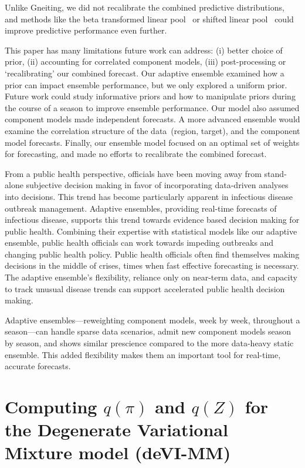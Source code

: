 \documentclass[12pt]{article}
\begin{document}
Unlike Gneiting, we did not recalibrate the combined predictive distributions, and methods like the beta transformed linear pool~\cite{ranjan2010combining} or shifted linear pool~\cite{kleiber2011locally} could improve predictive performance even further.

This paper has many limitations future work can address: (i) better choice of prior, (ii) accounting for correlated component models, (iii) post-processing or `recalibrating' our combined forecast.
Our adaptive ensemble examined how a prior can impact ensemble performance, but we only explored a uniform prior.
Future work could study informative priors and how to manipulate priors during the course of a season to improve ensemble performance.
Our model also assumed component models made independent forecasts.
A more advanced ensemble would examine the correlation structure of the data~(region, target), and the component model forecasts.
Finally, our ensemble model focused on an optimal set of weights for forecasting, and made no efforts to recalibrate the combined forecast.\cite{gneiting2013combining}

From a public health perspective, officials have been moving away from stand-alone subjective decision making in favor of  incorporating data-driven analyses into decisions.
This trend has become particularly apparent in infectious disease outbreak management.\cite{Rivers2019}
Adaptive ensembles, providing real-time forecasts of infectious disease, supports this trend towards evidence based decision making for public health.
Combining their expertise with statistical models like our adaptive ensemble, public health officials can work towards impeding outbreaks and changing public health policy.
Public health officials often find themselves making decisions in the middle of crises, times when fast effective forecasting is necessary. 
The adaptive ensemble's flexibility, reliance only on near-term data, and capacity to track unusual disease trends can support accelerated public health decision making.

Adaptive ensembles---reweighting component models, week by week, throughout a season---can handle sparse data scenarios, admit new component models season by season, and shows similar prescience compared to the more data-heavy static ensemble.
This added flexibility makes them an important tool for real-time, accurate forecasts.

\clearpage
\appendix

\section{Computing $q(\pi)$ and $q(Z)$ for the Degenerate Variational Mixture model (deVI-MM)} \label{sec:appendixA}
\end{document}
